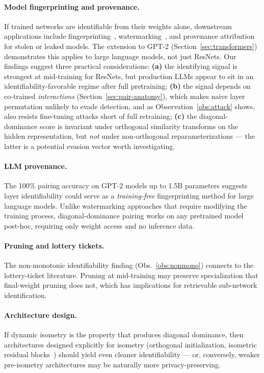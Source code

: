 \documentclass[10pt]{article}
\theoremstyle{remark}
\begin{document}
\paragraph{Model fingerprinting and provenance.} If trained networks are
identifiable from their weights alone, downstream applications include
fingerprinting~\cite{lukas2022deep}, watermarking~\cite{adi2018turning},
and provenance attribution for stolen or leaked models. The extension
to GPT-2 (Section~\ref{sec:transformers}) demonstrates this applies to
large language models, not just ResNets. Our findings
suggest three practical considerations: \textbf{(a)} the identifying
signal is strongest at mid-training for ResNets, but production LLMs
appear to sit in an identifiability-favorable regime after full pretraining;
\textbf{(b)} the signal depends on co-trained \emph{interactions}
(Section~\ref{sec:pair-anatomy}), which makes naive layer permutation
unlikely to evade detection, and as Observation~\ref{obs:attack} shows,
also resists fine-tuning attacks short of full retraining;
\textbf{(c)} the diagonal-dominance score is invariant under
orthogonal similarity transforms on the hidden representation, but
\emph{not} under non-orthogonal reparameterizations --- the latter
is a potential evasion vector worth investigating.

\paragraph{LLM provenance.} The 100\% pairing accuracy on GPT-2 models
up to 1.5B parameters suggests layer identifiability could serve as a
\emph{training-free} fingerprinting method for large language models.
Unlike watermarking approaches that require modifying the training
process, diagonal-dominance pairing works on any pretrained model
post-hoc, requiring only weight access and no inference data.

\paragraph{Pruning and lottery tickets.} The non-monotonic
identifiability finding (Obs.~\ref{obs:nonmono}) connects to the
lottery-ticket literature. Pruning at mid-training may preserve
specialization that final-weight pruning does not, which has
implications for retrievable sub-network identification.

\paragraph{Architecture design.} If dynamic isometry is the property
that produces diagonal dominance, then architectures designed
explicitly for isometry (orthogonal initialization, isometric residual
blocks~\cite{xiao2018dyn}) should yield even cleaner identifiability ---
or, conversely, weaker pre-isometry architectures may be naturally
more privacy-preserving.
\end{document}
